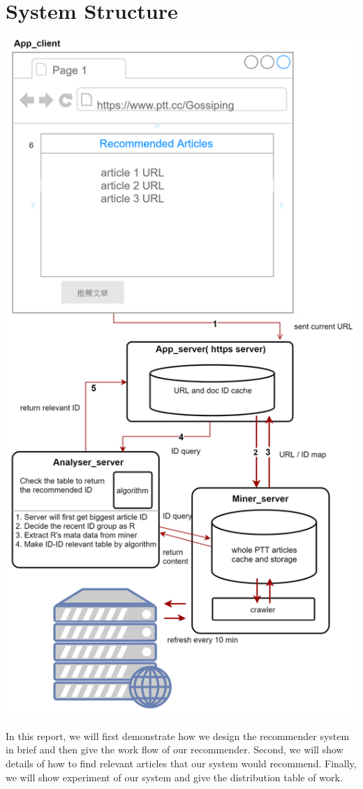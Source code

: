 \documentclass[a4paper, 10pt,twocolumn]{article} %
\begin{document}
\section{\label{sec:level1}System Structure}
\begin{center}
\includegraphics[scale=0.46]{structure.png}
\end{center}
In this report, we will first demonstrate how we design the recommender system in brief and then give the work flow of our recommender. Second, we will show details of how to find relevant articles that our system would recommend. Finally, we will show experiment of our system and give the distribution table of work.   
\end{document}
